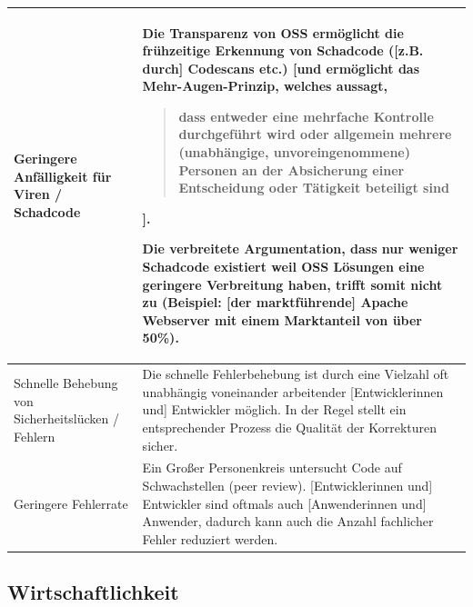 \documentclass[a4paper]{scrartcl}
\begin{document}
\begin{supertabular}{|m{1.8900598in}m{4.77126in}|}
\hline

Geringere Anfälligkeit für Viren / Schadcode &

Die Transparenz von OSS ermöglicht die frühzeitige Erkennung von Schadcode
([z.B. durch] Codescans etc.) [und ermöglicht das Mehr-Augen-Prinzip, welches
aussagt, \begin{quote}dass entweder eine mehrfache Kontrolle durchgeführt wird oder
  allgemein mehrere (unabhängige, unvoreingenommene) Personen an der Absicherung
  einer Entscheidung oder Tätigkeit beteiligt sind\end{quote}\footnotemark{}].

 Die verbreitete Argumentation, dass nur weniger
Schadcode existiert weil OSS Lösungen eine
geringere Verbreitung haben, trifft somit nicht zu (Beispiel: [der
marktführende] Apache Webserver mit einem Marktanteil von über
50\%).\\

\hline

Schnelle Behebung von Sicherheitslücken / Fehlern &

Die schnelle Fehlerbehebung ist durch eine Vielzahl oft unabhängig voneinander
arbeitender [Entwicklerinnen und] Entwickler möglich. In der Regel stellt ein
entsprechender Prozess die Qualität der Korrekturen sicher.\\

\hline

Geringere Fehlerrate &

Ein Großer Personenkreis untersucht Code auf Schwachstellen (peer
review). [Entwicklerinnen und] Entwickler sind oftmals auch [Anwenderinnen und]
Anwender, dadurch kann auch die Anzahl fachlicher Fehler reduziert
werden.\\

\hline
\end{supertabular}


\subsection{Wirtschaftlichkeit}
\end{document}

